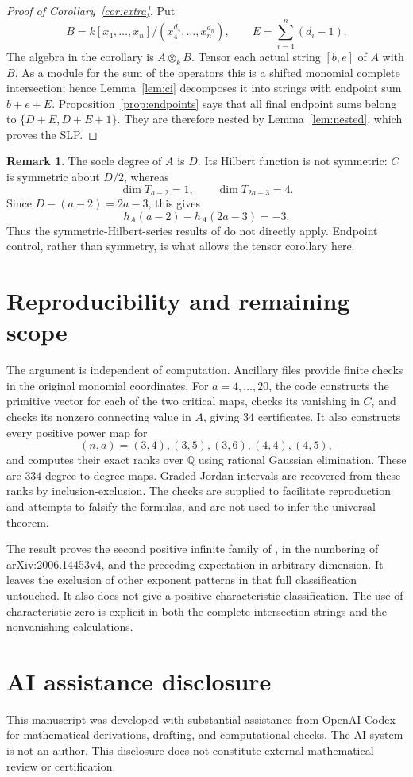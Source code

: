 \documentclass[11pt]{amsart}
\theoremstyle{definition}
\newtheorem{remark}[theorem]{Remark}
\newcommand{\Q}{\mathbb Q}
\begin{document}
\begin{proof}[Proof of Corollary~\ref{cor:extra}]
Put
\[
 B=k[x_4,\ldots,x_n]/(x_4^{d_4},\ldots,x_n^{d_n}),
 \qquad E=\sum_{i=4}^n(d_i-1).
\]
The algebra in the corollary is $A\otimes_k B$. Tensor each actual
string $[b,e]$ of $A$ with $B$. As a module for the sum of the
operators this is a shifted monomial complete intersection; hence
Lemma~\ref{lem:ci} decomposes it into strings with endpoint sum
$b+e+E$. Proposition~\ref{prop:endpoints} says that all final endpoint
sums belong to $\{D+E,D+E+1\}$. They are therefore nested by
Lemma~\ref{lem:nested}, which proves the SLP.
\end{proof}

\begin{remark}\label{rem:nonsymmetric}
The socle degree of $A$ is $D$. Its Hilbert function is not symmetric:
$C$ is symmetric about $D/2$, whereas
\[
 \dim T_{a-2}=1,\qquad \dim T_{2a-3}=4.
\]
Since $D-(a-2)=2a-3$, this gives
\[
 h_A(a-2)-h_A(2a-3)=-3.
\]
Thus the symmetric-Hilbert-series results of
\cite[Proposition~4.2 and Theorem~4.3]{CJK2026} do not directly apply.
Endpoint control, rather than symmetry, is what allows the tensor
corollary here.
\end{remark}

\section{Reproducibility and remaining scope}

The argument is independent of computation. Ancillary files provide
finite checks in the original monomial coordinates. For $a=4,\ldots,20$,
the code constructs the primitive vector for each of the two critical
maps, checks its vanishing in $C$, and checks its nonzero connecting
value in $A$, giving $34$ certificates. It also constructs every positive
power map for
\[
 (n,a)=(3,4),(3,5),(3,6),(4,4),(4,5),
\]
and computes their exact ranks over $\Q$ using rational Gaussian
elimination. These are $334$ degree-to-degree maps. Graded Jordan
intervals are recovered from these ranks by inclusion-exclusion.
The checks are supplied to facilitate reproduction and attempts to
falsify the formulas, and are not used to infer the universal theorem.

The result proves the second positive infinite family of
\cite[Conjecture~1]{GLN2022}, in the numbering of
arXiv:2006.14453v4, and the preceding expectation in arbitrary dimension.
It leaves the exclusion of other exponent patterns in that full
classification untouched. It also does not give a positive-characteristic
classification. The use of characteristic zero is explicit in both the
complete-intersection strings and the nonvanishing calculations.

\section*{AI assistance disclosure}
This manuscript was developed with substantial assistance from OpenAI
Codex for mathematical derivations, drafting, and computational checks.
The AI system is not an author. This disclosure does not constitute
external mathematical review or certification.



\end{document}
